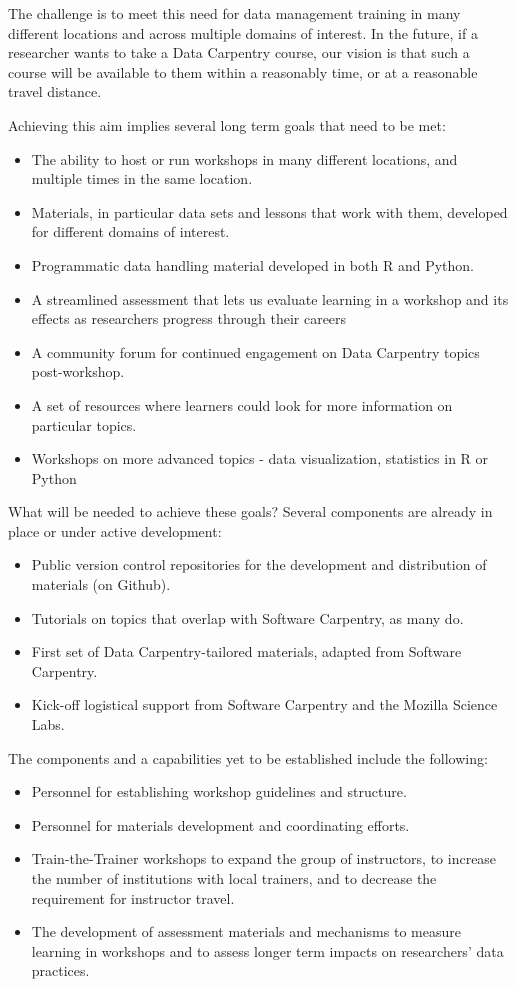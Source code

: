 \documentclass[11pt]{article}
\begin{document}
The challenge is to meet this need for data management training in many different locations and across multiple domains of interest.
In the future, if a researcher wants to take a Data Carpentry course, our vision is that such a course will be available to them within a reasonably time, or at a reasonable travel distance.  
 
Achieving this aim implies several long term goals that need to be met:

\begin{itemize}
\item The ability to host or run workshops in many different locations, and
multiple times in the same location. 
\item Materials, in particular data sets and lessons that work with them, developed for different domains of interest.
\item Programmatic data handling material developed in both R and Python. 
\item A streamlined assessment that lets us evaluate learning in a workshop and its effects
as researchers progress through their careers
\item A community forum for continued engagement on Data Carpentry topics post-workshop.
\item A set of resources where learners could look for more information on particular topics.
\item Workshops on more advanced topics - data visualization, statistics in R or Python
\end{itemize}

What will be needed to achieve these goals?
Several components are already in place or under active development:
\begin{itemize}
\item Public version control repositories for the development and distribution of materials (on Github).
\item Tutorials on topics that overlap with Software Carpentry, as many do.
\item First set of Data Carpentry-tailored materials, adapted from Software Carpentry.
\item Kick-off logistical support from Software Carpentry and the Mozilla Science Labs.
\end{itemize}

The components and a capabilities yet to be established include the following:
\begin{itemize}
\item Personnel for establishing workshop guidelines and structure.
\item Personnel for materials development and coordinating efforts.
\item Train-the-Trainer workshops to expand the group of instructors, to increase the number of institutions with local trainers, and to decrease the requirement for instructor travel.
\item The development of assessment materials and mechanisms to measure learning in workshops and to assess longer term impacts on 
researchers' data practices.
\end{itemize}
\end{document}
